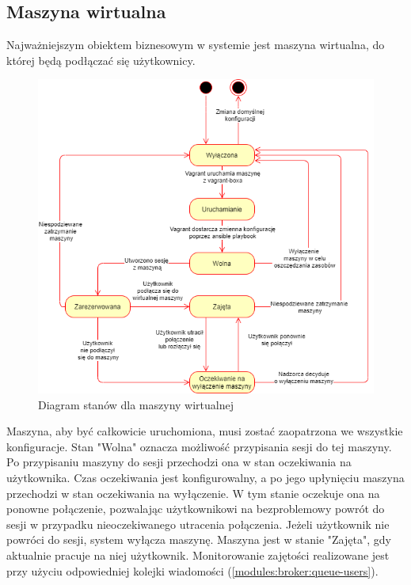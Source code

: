 \documentclass[../opis-rozwiazania.tex]{subfiles}
\begin{document}
\label{state_diagrams}

\subsection{Maszyna wirtualna}
Najważniejszym obiektem biznesowym w systemie jest maszyna wirtualna, do której będą podłączać się użytkownicy.

\begin{figure}[H]
    \centering
    \includegraphics[width=\textwidth]{../diagrams/state_diagrams/virtual_machine.png}
    \caption{Diagram stanów dla maszyny wirtualnej}
    \label{state_vm}
\end{figure}

Maszyna, aby być całkowicie uruchomiona, musi zostać zaopatrzona we wszystkie konfiguracje.
Stan "Wolna" oznacza możliwość przypisania sesji do tej maszyny.
Po przypisaniu maszyny do sesji przechodzi ona w stan oczekiwania na użytkownika. Czas oczekiwania jest konfigurowalny, a po jego upłynięciu maszyna przechodzi w stan oczekiwania na wyłączenie.
W tym stanie oczekuje ona na ponowne połączenie, pozwalając użytkownikowi na bezproblemowy powrót do sesji w przypadku nieoczekiwanego utracenia połączenia. Jeżeli użytkownik nie powróci do sesji, system wyłącza maszynę.
Maszyna jest w stanie "Zajęta", gdy aktualnie pracuje na niej użytkownik. Monitorowanie zajętości realizowane jest przy użyciu odpowiedniej kolejki wiadomości (\ref{modules:broker:queue-users}).
\end{document}
